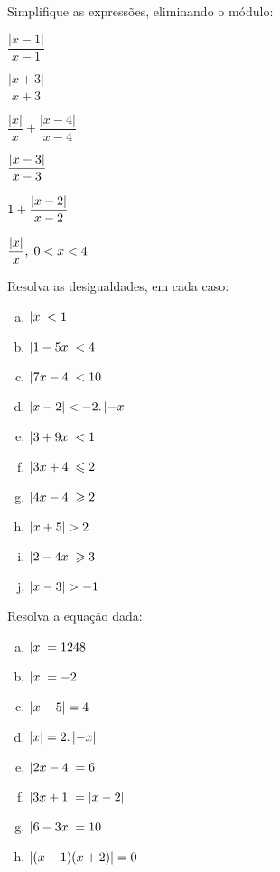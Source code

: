 \begin{secExercicios}

 \begin{exer}
    Simplifique as expressões, eliminando o módulo:
    \begin{enumerate}[a)] \begin{multicols}{2}
        \item $\dfrac{|x-1|}{x-1}$
        \item $\dfrac{|x+3|}{x+3}$
        \item $\dfrac{|x|}{x}+\dfrac{|x-4|}{x-4}$
        \item $\dfrac{\left|x-3\right|}{x-3}$
        \item $1 + \dfrac{\left|x-2\right|}{x-2}$
        \item $\dfrac{\left|x\right|}{x}, \; 0 < x < 4$
       \end{multicols} \end{enumerate}
\end{exer}

 \begin{exer}
    Resolva as desigualdades, em cada caso:
    \begin{enumerate}[a)]
        \item $\left|x\right| < 1$
        \item $\left|1-5x\right| <4$
        \item $\left|7x-4\right| <10$
        \columnbreak
        \item $\left|x-2\right| < -2.\left|-x\right|$
        \item $\left|3+9x\right| <1$
        \item $\left|3x+4\right|\leqslant 2$
        \item $\left|4x-4\right| \geqslant 2$
        \item $\left|x+5\right| >2$
        \item $\left|2-4x\right| \geqslant 3$
        \item $\left|x-3\right| > -1$
    \end{enumerate}
\end{exer}


\begin{exer}
    Resolva a equação dada:
    \begin{enumerate}[a)]
        \item $\left|x\right| = 1248$
        \item $\left|x\right| = -2$
        \item $\left|x-5\right| = 4$
        \item $\left|x\right|= 2.\left|-x\right|$
        \item $\left|2x-4\right| = 6$
        \item $\left|3x+1\right|=\left|x-2\right|$
        \item $\left|6-3x\right| = 10$
        \item $\left|(x-1)(x+2)\right| = 0$
    \end{enumerate}
\end{exer}



\end{secExercicios}
